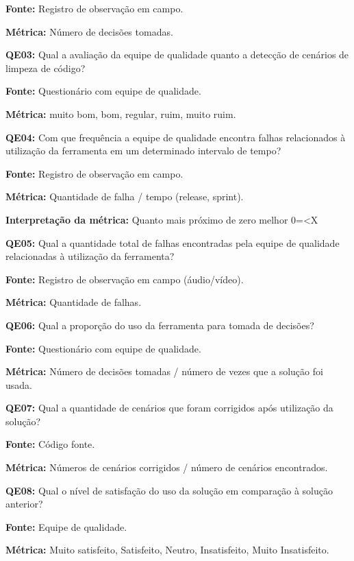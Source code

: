 \textbf{Fonte:} Registro de observação em campo.

\textbf{Métrica:} Número de decisões tomadas.


\textbf{QE03: } Qual a avaliação da equipe de qualidade quanto a detecção de cenários de limpeza de código?

\textbf{Fonte:} Questionário com equipe de qualidade.

\textbf{Métrica:} muito bom, bom, regular, ruim, muito ruim.


\textbf{QE04: } Com que frequência a equipe de qualidade encontra falhas relacionados à utilização da ferramenta em um determinado intervalo de tempo?

\textbf{Fonte:} Registro de observação em campo.

\textbf{Métrica:} Quantidade de falha / tempo (release, sprint).

\textbf{Interpretação da métrica:} Quanto mais próximo de zero melhor 0=<X


\textbf{QE05: } Qual a quantidade total de falhas encontradas pela equipe de qualidade relacionadas à utilização da ferramenta?

\textbf{Fonte:} Registro de observação em campo (áudio/vídeo).

\textbf{Métrica:} Quantidade de falhas.


\textbf{QE06: } Qual a proporção do uso da ferramenta para tomada de decisões?

\textbf{Fonte:} Questionário com equipe de qualidade.

\textbf{Métrica:} Número de decisões tomadas / número de vezes que a solução foi usada.



\textbf{QE07: } Qual a quantidade de cenários que foram corrigidos após utilização da solução?

\textbf{Fonte:} Código fonte.

\textbf{Métrica:} Números de cenários corrigidos / número de cenários encontrados.


\textbf{QE08: } Qual o nível de satisfação do uso da solução em comparação à solução anterior? 

\textbf{Fonte:} Equipe de qualidade.

\textbf{Métrica:} Muito satisfeito, Satisfeito, Neutro, Insatisfeito, Muito Insatisfeito.

